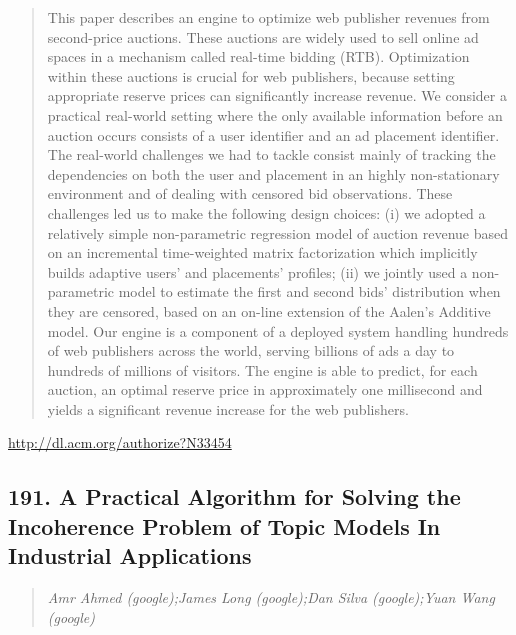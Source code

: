 \documentclass{article}
\begin{document}
\begin{quote}
This paper describes an engine to optimize web publisher revenues from second-price auctions. These auctions are widely used to sell online ad spaces in a mechanism called real-time bidding (RTB). Optimization within these auctions is crucial for web publishers, because setting appropriate reserve prices can significantly increase revenue. We consider a practical real-world setting where the only available information before an auction occurs consists of a user identifier and an ad placement identifier. The real-world challenges we had to tackle consist mainly of tracking the dependencies on both the user and placement in an highly non-stationary environment and of dealing with censored bid observations. These challenges led us to make the following design choices: (i) we adopted a relatively simple non-parametric regression model of auction revenue based on an incremental time-weighted matrix factorization which implicitly builds adaptive users’ and placements’ profiles; (ii) we jointly used a non-parametric model to estimate the first and second bids’ distribution when they are censored, based on an on-line extension of the Aalen’s Additive model. Our engine is a component of a deployed system handling hundreds of web publishers across the world, serving billions of ads a day to hundreds of millions of visitors. The engine is able to predict, for each auction, an optimal reserve price in approximately one millisecond and yields a significant revenue increase for the web publishers.
\end{quote}

\href{http://dl.acm.org/authorize?N33454}{http://dl.acm.org/authorize?N33454}

\subsection{191. A Practical Algorithm for Solving the Incoherence Problem of Topic Models In Industrial Applications}

\begin{quote}
\footnotesize{\textit{Amr Ahmed (google);James Long (google);Dan Silva (google);Yuan Wang (google)}}

\end{quote}
\end{document}
